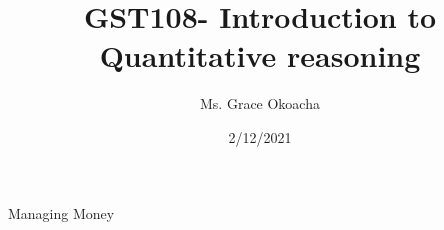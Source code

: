 \documentclass{article}
\title{GST108- Introduction to Quantitative reasoning}
\date{2/12/2021}
\author{Ms. Grace Okoacha}
\begin{document}
	\maketitle
	Managing Money
\end{document}
